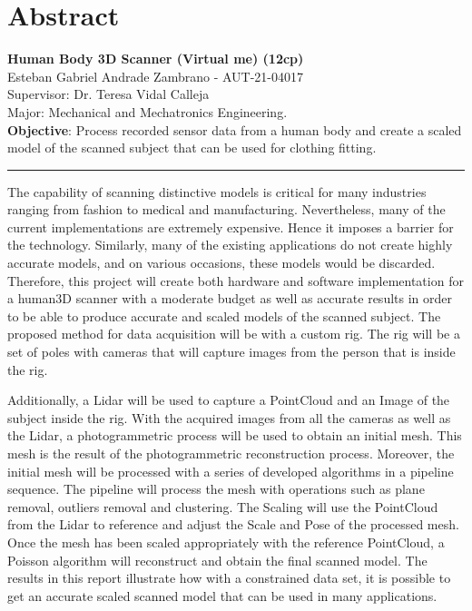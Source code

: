 \documentclass[12pt]{report}
\begin{document}
\chapter*{Abstract}
\textbf{Human Body 3D Scanner (Virtual me) (12cp)}\\
Esteban Gabriel Andrade Zambrano - AUT-21-04017\\
Supervisor: Dr. Teresa Vidal Calleja\\
Major: Mechanical and Mechatronics Engineering.\\
\textbf{Objective}: Process recorded sensor data from a human body and create a scaled model of the scanned subject that can be used for clothing fitting.\\
\rule{\textwidth}{0.1pt}
The capability of scanning distinctive models is critical for many industries ranging from fashion to medical and manufacturing. 
Nevertheless, many of the current implementations are extremely expensive. Hence it imposes a barrier for the technology.
 Similarly, many of the existing applications do not create highly accurate models, and on various occasions, these models would be discarded. 
 Therefore, this project will create both hardware and software implementation for a human3D scanner with a moderate budget as well as accurate results in order to be able to produce accurate and scaled models of the scanned subject. 
 The proposed method for data acquisition will be with a custom rig. The rig will be a set of poles with cameras that will capture images from the person that is inside the rig.

Additionally, a Lidar will be used to capture a PointCloud and an Image of the subject inside the rig. 
With the acquired images from all the cameras as well as the Lidar, a photogrammetric process will be used to obtain an initial mesh. 
This mesh is the result of the photogrammetric reconstruction process. Moreover, the initial mesh will be processed with a series of developed algorithms in a pipeline sequence. 
The pipeline will process the mesh with operations such as plane removal, outliers removal and clustering. 
The Scaling will use the PointCloud from the Lidar to reference and adjust the Scale and Pose of the processed mesh. 
Once the mesh has been scaled appropriately with the reference PointCloud, a Poisson algorithm will reconstruct and obtain the final scanned model. 
The results in this report illustrate how with a constrained data set, it is possible to get an accurate scaled scanned model that can be used in many applications.
\end{document}
